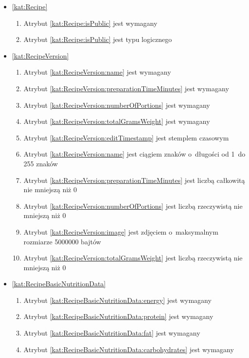 \begin{itemize}[label={\textbf{Ograniczenia dla}}, wide, labelwidth=!, labelindent=0pt]
    \setlength\itemsep{1.75em}
    \item\ref{kat:Recipe}\mynobreakpar
    \begin{enumerate}[label={\textbf{OGR/3/\protect\twodigits{\arabic{enumi}}}}, wide, labelwidth=!, align=left, leftmargin=3cm]
        \item Atrybut \ref{kat:Recipe:isPublic} jest wymagany

        \item Atrybut \ref{kat:Recipe:isPublic} jest typu logicznego
    \end{enumerate}

    \item\ref{kat:RecipeVersion}\mynobreakpar
    \begin{enumerate}[label={\textbf{OGR/3/\protect\twodigits{\arabic{enumi}}}}, wide, labelwidth=!, align=left, leftmargin=3cm, resume]
        \item Atrybut \ref{kat:RecipeVersion:name} jest wymagany
        \item Atrybut \ref{kat:RecipeVersion:preparationTimeMinutes} jest wymagany
        \item Atrybut \ref{kat:RecipeVersion:numberOfPortions} jest wymagany
        \item Atrybut \ref{kat:RecipeVersion:totalGramsWeight} jest wymagany

        \item Atrybut \ref{kat:RecipeVersion:editTimestamp} jest stemplem czasowym
        \item Atrybut \ref{kat:RecipeVersion:name} jest ciągiem znaków o~długości od 1~do 255 znaków
        \item Atrybut \ref{kat:RecipeVersion:preparationTimeMinutes} jest liczbą całkowitą nie mniejszą niż 0
        \item Atrybut \ref{kat:RecipeVersion:numberOfPortions} jest liczbą rzeczywistą nie mniejszą niż 0
        \item Atrybut \ref{kat:RecipeVersion:image} jest zdjęciem o~maksymalnym rozmiarze 5000000 bajtów
        \item Atrybut \ref{kat:RecipeVersion:totalGramsWeight} jest liczbą rzeczywistą nie mniejszą niż 0
    \end{enumerate}

    \item\ref{kat:RecipeBasicNutritionData}\mynobreakpar
    \begin{enumerate}[label={\textbf{OGR/3/\protect\twodigits{\arabic{enumi}}}}, wide, labelwidth=!, align=left, leftmargin=3cm, resume]
        \item Atrybut \ref{kat:RecipeBasicNutritionData:energy} jest wymagany
        \item Atrybut \ref{kat:RecipeBasicNutritionData:protein} jest wymagany
        \item Atrybut \ref{kat:RecipeBasicNutritionData:fat} jest wymagany
        \item Atrybut \ref{kat:RecipeBasicNutritionData:carbohydrates} jest wymagany


\end{enumerate}
\end{itemize}
